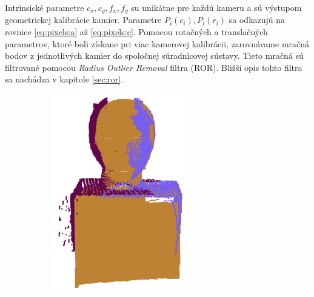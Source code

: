 Intrinsické parametre $c_x, c_y, f_x, f_y$ su unikátne pre každú kameru a sú výstupom geometrickej kalibrácie kamier. Parametre $P_i(c_i),P_i(r_i)$ sa odkazujú na rovnice \ref{eq:pixels:a} až \ref{eq:pixels:c}. Pomocou rotačných a translačných parametrov, ktoré boli získane pri viac kamerovej kalibrácii, zarovnávame mračná bodov z jednotlivých kamier do spoločnej súradnicovej sústavy. Tieto mračná sú filtrované pomocou \textit{Radius Outlier Removal} filtra (ROR). Bližší opis tohto filtra sa nachádza v kapitole \ref{sec:ror}. 


\begin{figure}[h]
	\centering
	\begin{subfigure}[b]{0.32\textwidth}
		\centering
		\includegraphics[width=0.65\textwidth]{figures/model_colors.png}
		\caption{}
		\label{fig:ror:a}
	\end{subfigure}
	\hfill
	\begin{subfigure}[b]{0.32\textwidth}
		\centering

\end{subfigure}
\end{figure}
